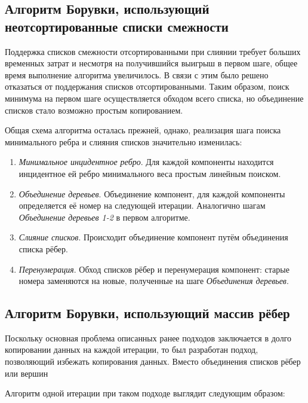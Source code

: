 \documentclass{article}
\begin{document}
\subsection{Алгоритм Борувки, использующий неотсортированные списки смежности}

Поддержка списков смежности отсортированными при слиянии требует больших временных затрат и несмотря на получившийся выигрыш в первом шаге, общее время выполнение алгоритма увеличилось.
В связи с этим было решено отказаться от поддержания списков отсортированными. Таким образом, поиск минимума на первом шаге осуществляется обходом всего списка, но объединение списков стало возможно простым копированием.

Общая схема алгоритма осталась прежней, однако, реализация шага поиска минимального ребра и слияния списков значительно изменилась:
\begin{enumerate}
    \item \textit{Минимальное инцидентное ребро}.
        Для каждой компоненты находится инцидентное ей ребро минимального веса простым линейным поиском.
    \item \textit{Объединение деревьев}.
        Объединение компонент, для каждой компоненты определяется её номер на следующей итерации. 
        Аналогично шагам \textit{Объединение деревьев 1-2} в первом алгоритме.
    \item \textit{Слияние списков}.
        Происходит объединение компонент путём объединения списка рёбер.
    \item \textit{Перенумерация}.
        Обход списков рёбер и перенумерация компонент: старые номера заменяются на новые, полученные на шаге \textit{Объединения деревьев}.
\end{enumerate}

\subsection{Алгоритм Борувки, использующий массив рёбер}

Поскольку основная проблема описанных ранее подходов заключается в долго копировании данных на каждой итерации, то был разработан подход, позволяющий избежать копирования данных.
Вместо объединения списков рёбер или вершин 

Алгоритм одной итерации при таком подходе выглядит следующим образом:
\end{document}
